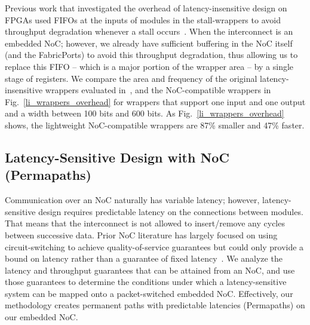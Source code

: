 {{Previous work that investigated the overhead of latency-insensitive design on FPGAs used FIFOs at the inputs of modules in the stall-wrappers to avoid throughput degradation whenever a stall occurs~\cite{Murray2014}.
When the interconnect is an embedded NoC; however, we already have sufficient buffering in the NoC itself (and the FabricPorts) to avoid this throughput degradation, thus allowing us to replace this FIFO -- which is a major portion of the wrapper area -- by a single stage of registers.
We compare the area and frequency of the original latency-insensitive wrappers evaluated in~\cite{Murray2014}, and the NoC-compatible wrappers in Fig.~\ref{li_wrappers_overhead} for wrappers that support one input and one output and a width between 100 bits and 600 bits.
As Fig.~\ref{li_wrappers_overhead} shows, the lightweight NoC-compatible wrappers are 87\% smaller and 47\% faster.
}
}


%
\subsection{Latency-Sensitive Design with NoC (Permapaths)}
%

Communication over an NoC naturally has variable latency; however, latency-sensitive design requires predictable latency on the connections between modules.
That means that the interconnect is not allowed to insert/remove any cycles between successive data.
Prior NoC literature has largely focused on using circuit-switching to achieve quality-of-service guarantees but could only provide a bound on latency rather than a guarantee of fixed latency~\cite{Goossens2005}.
We analyze the latency and throughput guarantees that can be attained from an NoC, and use those guarantees to determine the conditions under which a latency-sensitive system can be mapped onto a packet-switched embedded NoC.
Effectively, our methodology creates permanent paths with predictable latencies (Permapaths) on our embedded NoC.


